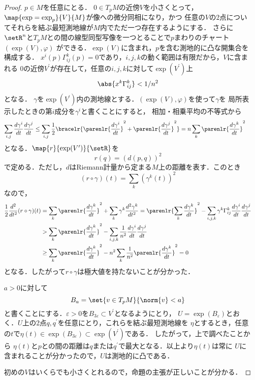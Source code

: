 \documentclass[uplatex]{jsarticle}
\providecommand{\DIFadd}[1]{{\protect\color{blue}\uwave{#1}}} %
\providecommand{\DIFaddbegin}{} %
\providecommand{\DIFaddend}{} %
\begin{document}
\begin{proof}
  $p\in M$を任意にとる．
  $0\in T_pM$の近傍$V$を小さくとって，$\map{\exp=\exp_p}{V}{M}$が像への微分同相になり，かつ
  任意の$V$の2点についてそれらを結ぶ最短測地線が$M$内でただ一つ存在するようにする．
  さらに$\setR^n$と$T_p M$との間の線型同型写像を一つとることで$p$まわりのチャート$(\exp(V), \varphi)$
  ができる．\DIFaddbegin \DIFadd{以下では，}\DIFaddend $\exp(V)$に含まれ，$p$を含む測地的に凸な開集合を構成する．
  $x^i(p)\Gamma_{ij}^k(p) = 0$であり，$i, j, k$の動く範囲は有限だから，$V$に含まれる
  0の近傍$V^\prime$が存在して，任意の$i, j, k$に対して$\exp(V^\prime)$上
    \[\abs{x^k\Gamma_{ij}^k} < 1 / n^2 \]
  となる．
  $\gamma$を$\exp(V^\prime)$内の測地線とする．$(\exp(V),\varphi)$を使って$\gamma$を
  局所表示したときの第$i$成分を$\gamma^i$と書くことにすると，
  相加・相乗平均の不等式から
  \begin{align*}
    \sum_{i, j} \frac{d\gamma^i}{dt} \frac{d\gamma^j}{dt} 
      &\leq \sum_{i, j} \frac{1}{2} \bracelr{\parenlr{\frac{d\gamma^i}{dt}}^2 + 
      \parenlr{\frac{d\gamma^j}{dt}}^2} = n\sum_k \parenlr{\frac{d\gamma^k}{dt}}^2
  \end{align*}
  となる．$\map{r}{\exp(V^\prime)}{\setR}$を
    \[r(q) = (d(p,q))^2 \]
  で定める．ただし，$d$はRiemann計量から定まる$M$上の距離を表す．このとき
  \[(r\circ \gamma)(t) = \sum_k (\gamma^k(t))^2\]
  なので，
  \begin{align*}
    \frac{1}{2}\frac{d^2}{dt^2}(r\circ \gamma)(t)
      &= \sum_k \parenlr{\frac{d\gamma^k}{dt}}^2 + \sum_k \gamma^k \frac{d^2\gamma^k}{dt^2} 
      = \parenlr{\sum_k\frac{d\gamma^k}{dt}}^2 - \sum_{i, j, k} \gamma^k \Gamma_{ij}^k\frac{d\gamma^i}{dt}\frac{d\gamma^j}{dt} \\
    &> \sum_k \parenlr{\frac{d\gamma^k}{dt}}^2 
      - \sum_{i,j,k} \frac{1}{n^2}\frac{d\gamma^i}{dt}\frac{d\gamma^j}{dt} \\
    &\geq \sum_k \parenlr{\frac{d\gamma^k}{dt}}^2 - n^2\sum_k\frac{1}{n^2}\parenlr{\frac{d\gamma^k}{dt}}^2  = 0
  \end{align*}
  となる．したがって$r\circ \gamma$は極大値を持たないことが分かった．

  $a>0$に対して
    \[B_a = \set{v\in T_p M}{\norm{v} < a} \]
  と書くことにする．$\varepsilon>0$を$B_{3\varepsilon} \subset V^\prime$となるようにとり，
  $U = \exp(B_\varepsilon)$とおく．$U$上の2点$q, q^\prime$を任意にとり，これらを結ぶ最短測地線を
  $\eta$とするとき，任意の$t$で$\eta(t)\in \exp(B_{3\varepsilon})\subset \exp(V^\prime)$である．
  したがって，上で調べたことから
  $\eta(t)$と$p$との間の距離は$q$または$q^\prime$で最大となる．以上より$\eta(t)$は常に
  $U$に含まれることが分かったので，$U$は測地的に凸である．

  初めの$V$はいくらでも小さくとれるので，命題の主張が正しいことが分かる．
\end{proof}
\end{document}
